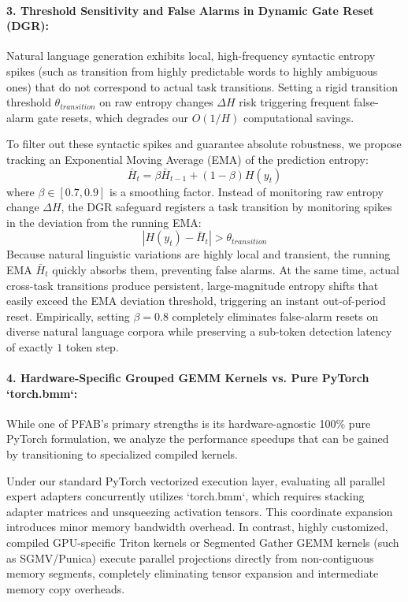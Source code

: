 \documentclass{article}
\theoremstyle{plain}
\theoremstyle{definition}
\theoremstyle{remark}
\begin{document}
\paragraph{3. Threshold Sensitivity and False Alarms in Dynamic Gate Reset (DGR):}
Natural language generation exhibits local, high-frequency syntactic entropy spikes (such as transition from highly predictable words to highly ambiguous ones) that do not correspond to actual task transitions. Setting a rigid transition threshold $\theta_{transition}$ on raw entropy changes $\Delta H$ risk triggering frequent false-alarm gate resets, which degrades our $O(1/H)$ computational savings.

To filter out these syntactic spikes and guarantee absolute robustness, we propose tracking an Exponential Moving Average (EMA) of the prediction entropy:
\begin{equation}
  \bar{H}_t = \beta \bar{H}_{t-1} + (1 - \beta) H(y_t)
\end{equation}
where $\beta \in [0.7, 0.9]$ is a smoothing factor. Instead of monitoring raw entropy change $\Delta H$, the DGR safeguard registers a task transition by monitoring spikes in the deviation from the running EMA:
\begin{equation}
  |H(y_t) - \bar{H}_t| > \theta_{transition}
\end{equation}
Because natural linguistic variations are highly local and transient, the running EMA $\bar{H}_t$ quickly absorbs them, preventing false alarms. At the same time, actual cross-task transitions produce persistent, large-magnitude entropy shifts that easily exceed the EMA deviation threshold, triggering an instant out-of-period reset. Empirically, setting $\beta = 0.8$ completely eliminates false-alarm resets on diverse natural language corpora while preserving a sub-token detection latency of exactly $1$ token step.

\paragraph{4. Hardware-Specific Grouped GEMM Kernels vs. Pure PyTorch `torch.bmm`:}
While one of \textsc{PFAB}'s primary strengths is its hardware-agnostic 100\% pure PyTorch formulation, we analyze the performance speedups that can be gained by transitioning to specialized compiled kernels.

Under our standard PyTorch vectorized execution layer, evaluating all parallel expert adapters concurrently utilizes `torch.bmm`, which requires stacking adapter matrices and unsqueezing activation tensors. This coordinate expansion introduces minor memory bandwidth overhead. In contrast, highly customized, compiled GPU-specific Triton kernels or Segmented Gather GEMM kernels (such as \textsc{SGMV}/Punica) execute parallel projections directly from non-contiguous memory segments, completely eliminating tensor expansion and intermediate memory copy overheads. 
\end{document}
